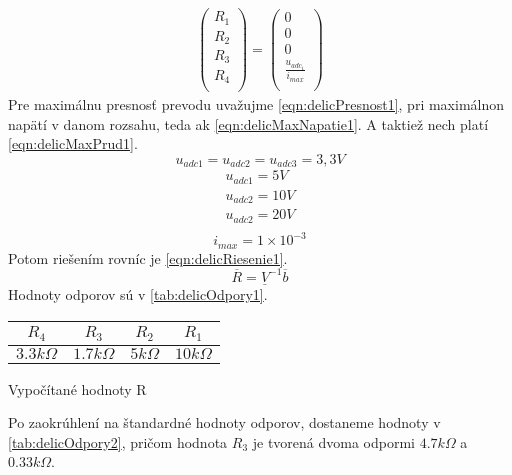 \documentclass[main.tex]{subfiles}
\begin{document}
\begin{multicols*}{2}
\begin{equation}
\begin{split}
		\begin{pmatrix}
		R_1 \\
		R_2 \\
		R_3 \\
		R_4  \\
		\end{pmatrix} =
		\begin{pmatrix}
		0 \\
		0 \\
		0 \\
		\frac{u_{adc_1}}{i_{max}}  \\
		\end{pmatrix}
		\end{split}
		\label{eqn:delicMatica2}
		\end{equation}
		Pre maximálnu presnosť prevodu uvažujme \cref{eqn:delicPresnost1}, pri maximálnon napätí v danom rozsahu, teda ak \cref{eqn:delicMaxNapatie1}. A taktiež nech platí \cref{eqn:delicMaxPrud1}. 
		\begin{equation}
		u_{adc1} = u_{adc2} = u_{adc3} = 3,3V \label{eqn:delicPresnost1}
		\end{equation}
		\begin{equation}
		\begin{split}
		u_{adc1} = 5 V\\
		u_{adc2} = 10 V \\
		u_{adc2} = 20 V\\ \label{eqn:delicMaxNapatie1}
		\end{split}
		\end{equation}
		\begin{equation}
		i_{max} = 1\times 10 ^{-3} \label{eqn:delicMaxPrud1}
		\end{equation}
		Potom riešením rovníc je \cref{eqn:delicRiesenie1}.
		\begin{equation}
		\overline{R} = \underline{V}^{-1}\overline{b} \label{eqn:delicRiesenie1}
		\end{equation}
		Hodnoty odporov sú v \cref{tab:delicOdpory1}.
		\vskip 0.05cm
		\begin{tablehere}
			\centering
			\begin{tabular}{cccc}
				$R_4$ & $R_3$ & $R_2$ & $R_1$ \\
				\hline
				$3.3k\Omega$ & $1.7k\Omega$ & $5k\Omega$ & $10k\Omega$ \\
			\end{tabular}
			\caption{Vypočítané hodnoty R} \label{tab:delicOdpory1}
			\vskip 0.1cm
		\end{tablehere}
		\noindent Po zaokrúhlení na štandardné hodnoty odporov, dostaneme hodnoty v \cref{tab:delicOdpory2}, pričom hodnota $R_3$ je tvorená dvoma odpormi $4.7k\Omega$ a $0.33k\Omega$.

\end{multicols*}
\end{document}
